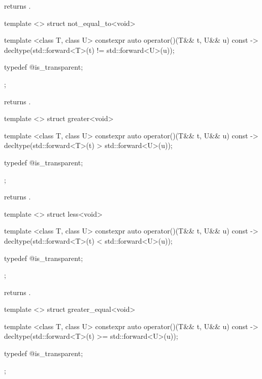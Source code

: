 \begin{itemdescr}
\pnum
{} returns .
\end{itemdescr}

%
\begin{itemdecl}
template <> struct not_equal_to<void> {
  template <class T, class U> constexpr auto operator()(T&& t, U&& u) const
    -> decltype(std::forward<T>(t) != std::forward<U>(u));

  typedef @\unspec@ is_transparent;
};
\end{itemdecl}

\begin{itemdescr}
\pnum
{} returns .
\end{itemdescr}

%
\begin{itemdecl}
template <> struct greater<void> {
  template <class T, class U> constexpr auto operator()(T&& t, U&& u) const
    -> decltype(std::forward<T>(t) > std::forward<U>(u));

  typedef @\unspec@ is_transparent;
};
\end{itemdecl}

\begin{itemdescr}
\pnum
{} returns .
\end{itemdescr}

%
\begin{itemdecl}
template <> struct less<void> {
  template <class T, class U> constexpr auto operator()(T&& t, U&& u) const
    -> decltype(std::forward<T>(t) < std::forward<U>(u));

  typedef @\unspec@ is_transparent;
};
\end{itemdecl}

\begin{itemdescr}
\pnum
{} returns .
\end{itemdescr}

%
\begin{itemdecl}
template <> struct greater_equal<void> {
  template <class T, class U> constexpr auto operator()(T&& t, U&& u) const
    -> decltype(std::forward<T>(t) >= std::forward<U>(u));

  typedef @\unspec@ is_transparent;
};
\end{itemdecl}

